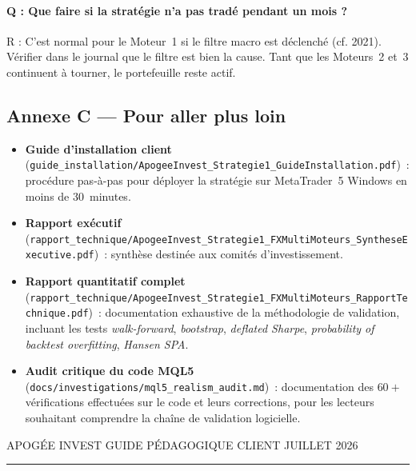 \documentclass[11pt, a4paper]{scrartcl}
\begin{document}
\paragraph{Q : Que faire si la stratégie n'a pas tradé pendant un mois ?}
R : C'est normal pour le Moteur~1 si le filtre macro est déclenché (cf. 2021). Vérifier dans le journal que le filtre est bien la cause. Tant que les Moteurs~2 et~3 continuent à tourner, le portefeuille reste actif.

\subsection*{Annexe C --- Pour aller plus loin}

\begin{itemize}
\item \textbf{Guide d'installation client} (\texttt{guide\_installation/ApogeeInvest\_Strategie1\_GuideInstallation.pdf})~: procédure pas-à-pas pour déployer la stratégie sur MetaTrader~5 Windows en moins de 30~minutes.
\item \textbf{Rapport exécutif} (\texttt{rapport\_technique/ApogeeInvest\_Strategie1\_FXMultiMoteurs\_SyntheseExecutive.pdf})~: synthèse destinée aux comités d'investissement.
\item \textbf{Rapport quantitatif complet} (\texttt{rapport\_technique/ApogeeInvest\_Strategie1\_FXMultiMoteurs\_RapportTechnique.pdf})~: documentation exhaustive de la méthodologie de validation, incluant les tests \emph{walk-forward}, \emph{bootstrap}, \emph{deflated Sharpe}, \emph{probability of backtest overfitting}, \emph{Hansen SPA}.
\item \textbf{Audit critique du code MQL5} (\texttt{docs/investigations/mql5\_realism\_audit.md})~: documentation des $60+$ vérifications effectuées sur le code et leurs corrections, pour les lecteurs souhaitant comprendre la chaîne de validation logicielle.
\end{itemize}

\vspace{2cm}

\begin{center}
{\interspaced\color{apogeeGold}\footnotesize APOGÉE INVEST \enskip\textbullet\enskip GUIDE PÉDAGOGIQUE CLIENT \enskip\textbullet\enskip JUILLET 2026\par}

\vspace{0.3cm}

{\color{apogeeGold}\rule{0.4\textwidth}{0.4pt}}
\end{center}
\end{document}
